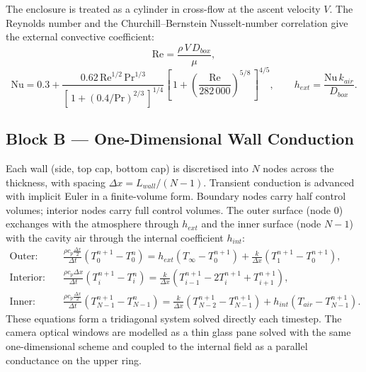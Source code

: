 \documentclass[11pt,a4paper]{article}
\begin{document}
The enclosure is treated as a cylinder in cross-flow at the ascent velocity $V$. The
Reynolds number and the Churchill--Bernstein Nusselt-number correlation give the
external convective coefficient:
\begin{equation}
\mathrm{Re} = \frac{\rho\,V\,D_{box}}{\mu},
\end{equation}
\begin{equation}
\mathrm{Nu} = 0.3 +
\frac{0.62\,\mathrm{Re}^{1/2}\,\mathrm{Pr}^{1/3}}
{\left[\,1+(0.4/\mathrm{Pr})^{2/3}\,\right]^{1/4}}
\left[\,1+\left(\frac{\mathrm{Re}}{282\,000}\right)^{5/8}\,\right]^{4/5},
\qquad
h_{ext} = \frac{\mathrm{Nu}\,k_{air}}{D_{box}}.
\end{equation}

\subsection{Block B --- One-Dimensional Wall Conduction}
Each wall (side, top cap, bottom cap) is discretised into $N$ nodes across the
thickness, with spacing $\Delta x = L_{wall}/(N-1)$. Transient conduction is advanced
with implicit Euler in a finite-volume form. Boundary nodes carry half control volumes;
interior nodes carry full control volumes. The outer surface (node $0$) exchanges with
the atmosphere through $h_{ext}$ and the inner surface (node $N-1$) with the cavity air
through the internal coefficient $h_{int}$:
\begin{align}
\text{Outer:}\quad &
\frac{\rho c_p \tfrac{\Delta x}{2}}{\Delta t}\left(T_0^{n+1}-T_0^{n}\right)
= h_{ext}\left(T_\infty - T_0^{n+1}\right) + \frac{k}{\Delta x}\left(T_1^{n+1}-T_0^{n+1}\right),\\[1mm]
\text{Interior:}\quad &
\frac{\rho c_p \Delta x}{\Delta t}\left(T_i^{n+1}-T_i^{n}\right)
= \frac{k}{\Delta x}\left(T_{i-1}^{n+1}-2T_i^{n+1}+T_{i+1}^{n+1}\right),\\[1mm]
\text{Inner:}\quad &
\frac{\rho c_p \tfrac{\Delta x}{2}}{\Delta t}\left(T_{N-1}^{n+1}-T_{N-1}^{n}\right)
= \frac{k}{\Delta x}\left(T_{N-2}^{n+1}-T_{N-1}^{n+1}\right) + h_{int}\left(T_{air}-T_{N-1}^{n+1}\right).
\end{align}
These equations form a tridiagonal system solved directly each timestep. The camera
optical windows are modelled as a thin glass pane solved with the same one-dimensional
scheme and coupled to the internal field as a parallel conductance on the upper ring.
\end{document}

